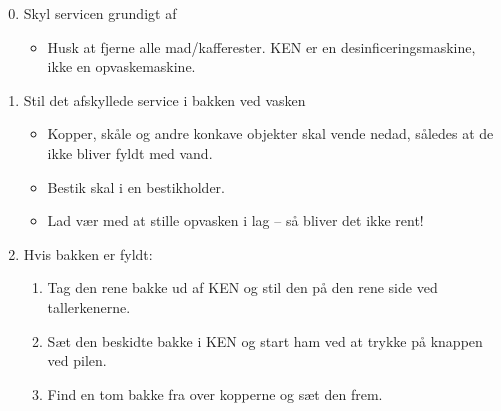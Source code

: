 \documentclass{article}
\begin{document}

\maketitle

\fontsize{17.28}{18}\selectfont

\begin{enumerate}

\setcounter{enumi}{-1}

\bfseries \item Skyl servicen grundigt af \normalfont

  \begin{itemize}

  \item Husk at fjerne alle mad/kafferester.  KEN er en
    desinficeringsmaskine, ikke en opvaskemaskine.

  \end{itemize}

\bfseries \item Stil det afskyllede service i bakken ved vasken
\normalfont

\begin{itemize}

  \item Kopper, skåle og andre konkave objekter skal vende nedad,
    således at de ikke bliver fyldt med vand.

  \item Bestik skal i en bestikholder.

  \item Lad vær med at stille opvasken i lag -- så bliver det ikke rent!

  \end{itemize}

\bfseries \item Hvis bakken er fyldt: \normalfont
  \begin{enumerate}

  \item Tag den rene bakke ud af KEN og stil den på den rene side ved
    tallerkenerne.

  \item Sæt den beskidte bakke i KEN og start ham ved at trykke på
    knappen ved pilen.

  \item Find en tom bakke fra over kopperne og sæt den frem.

  \end{enumerate}


\end{enumerate}
\end{document}
